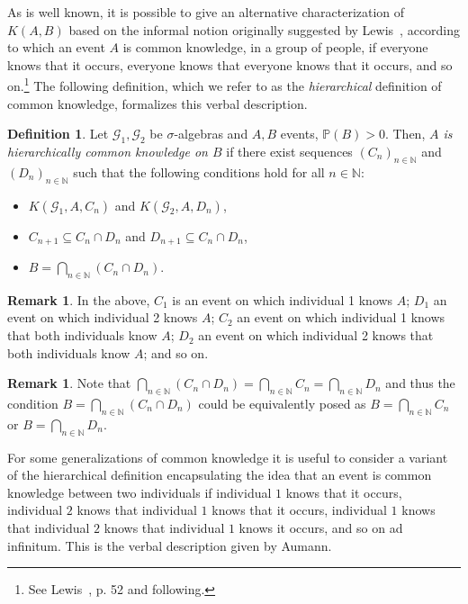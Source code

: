 \documentclass[a4paper, 10pt]{article}
\numberwithin{theorem}{section}
\theoremstyle{definition}
\newtheorem{definition}[theorem]{Definition}
\newtheorem{remark}[theorem]{Remark}
\newcommand{\N}{\mathbb{N}}
\newcommand{\G}{\mathcal{G}}
\renewcommand{\P}{\mathbb{P}}
\begin{document}
As is well known, it is possible to give an alternative characterization of $K(A,B)$ based on the informal notion originally suggested by Lewis~\cite{Le69}, according to which an event $A$ is common knowledge, in a group of people, if everyone knows that it occurs, everyone knows that everyone knows that it occurs, and so on.\footnote{See Lewis~\cite{Le69}, p. 52 and following.} 
 The following definition, which we refer to as the \emph{hierarchical} definition of common knowledge, formalizes this verbal description.


\begin{definition}\label{def-hierarchical-Lewis}
	Let $\G_1,\G_2$ be $\sigma$-algebras and $A,B$ events, $\P(B)>0$. Then, \emph{$A$ is hierarchically common knowledge on $B$} if there exist sequences $(C_n)_{n\in \N}$ and $(D_n)_{n\in \N}$ such that the following conditions hold for all $n \in \N$:
    \begin{itemize}
        \item $K(\G_1, A, C_n)$ and $K(\G_2,A,D_n)$,   
        \item $C_{n+1} \subseteq C_n \cap D_n$ and $D_{n+1} \subseteq C_n \cap D_n$, 
        \item $B=\bigcap_{n\in \N} \left( C_n \cap D_n \right)$.
    \end{itemize}
 
\end{definition}

\begin{remark}
       In the above, $C_1$ is an event on which individual 1 knows $A$; $D_1$ an event on which individual 2 knows $A$; $C_2$ an event on which individual 1 knows that both individuals know  $A$; $D_2$ an event on which individual 2 knows that both individuals know $A$; and so on.
\end{remark}

\begin{remark}
	Note that $\bigcap_{n\in \N} \left( C_n \cap D_n \right) = \bigcap_{n\in \N} C_n = \bigcap_{n\in \N} D_n $ and thus the condition  $B=\bigcap_{n\in \N} \left( C_n \cap D_n \right)$ could be equivalently posed as  $B=\bigcap_{n\in \N} C_n $ or  $B=\bigcap_{n\in \N} D_n$.
\end{remark}


For some generalizations of common knowledge it is useful to consider a variant of the hierarchical definition encapsulating the idea that an event is common knowledge between two individuals if individual $1$ knows that it occurs, individual $2$ knows that individual $1$ knows that it occurs, individual $1$ knows that individual $2$ knows that individual $1$ knows it occurs, and so on ad infinitum. This is the verbal description given by Aumann.
\end{document}
